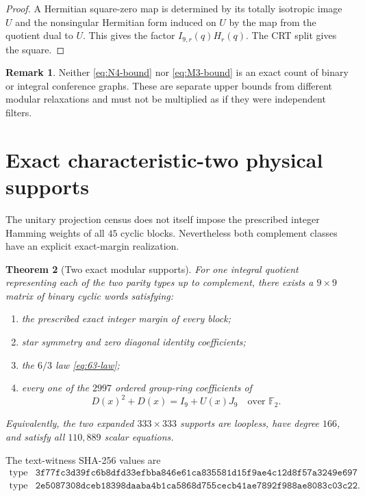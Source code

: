 \documentclass[11pt]{article}
\newtheorem{theorem}{Theorem}[section]
\theoremstyle{definition}
\newtheorem{remark}[theorem]{Remark}
\newcommand{\F}{\mathbb{F}}
\begin{document}
\begin{proof}
A Hermitian square-zero map is determined by its totally isotropic image
\(U\) and the nonsingular Hermitian form induced on \(U\) by the map from
the quotient dual to \(U\).  This gives the factor
\(I_{9,r}(q)H_r(q)\).  The CRT split gives the square.
\end{proof}

\begin{remark}
Neither \eqref{eq:N4-bound} nor \eqref{eq:M3-bound} is an exact count of
binary or integral conference graphs.  These are separate upper bounds
from different modular relaxations and must not be multiplied as if they
were independent filters.
\end{remark}

\section{Exact characteristic-two physical supports}
\label{sec:char2-supports}

The unitary projection census does not itself impose the prescribed
integer Hamming weights of all \(45\) cyclic blocks.  Nevertheless both
complement classes have an explicit exact-margin realization.

\begin{theorem}[Two exact modular supports]
\label{thm:char2-supports}
For one integral quotient representing each of the two parity types up to
complement, there exists a \(9\times9\) matrix of binary cyclic words
satisfying:
\begin{enumerate}[label=(\alph*)]
\item the prescribed exact integer margin of every block;
\item star symmetry and zero diagonal identity coefficients;
\item the \(6/3\) law \eqref{eq:63-law};
\item every one of the \(2997\) ordered group-ring coefficients of
\[
 D(x)^2+D(x)=I_9+U(x)J_9
 \quad\text{over }\F_2.
\tag{6.1}\label{eq:physical-mod2}
\]
\end{enumerate}
Equivalently, the two expanded \(333\times333\) supports are loopless,
have degree \(166\), and satisfy all \(110{,}889\) scalar equations.
\end{theorem}

The text-witness SHA-256 values are
\[
\begin{array}{c|l}
\text{type 1}&
\texttt{3f77fc3d39fc6b8dfd33efbba846e61ca835581d15f9ae4c12d8f57a3249e697}\\
\text{type 2}&
\texttt{2e5087308dceb18398daaba4b1ca5868d755cecb41ae7892f988ae8083c03c22}.
\end{array}
\tag{6.2}\label{eq:support-hashes}
\]
\end{document}
